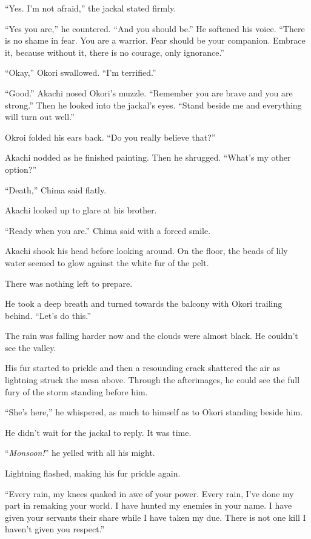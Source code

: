 ``Yes. I'm not afraid,'' the jackal stated firmly.

``Yes you are,'' he countered. ``And you should be.'' He softened his voice. ``There is no shame in fear. You are a warrior. Fear should be your companion. Embrace it, because without it, there is no courage, only ignorance.''

``Okay,'' Okori swallowed. ``I'm terrified.''

``Good.'' Akachi nosed Okori's muzzle. ``Remember you are brave and you are strong.'' Then he looked into the jackal's eyes. ``Stand beside me and everything will turn out well.''

Okroi folded his ears back. ``Do you really believe that?''

Akachi nodded as he finished painting. Then he shrugged. ``What's my other option?''

``Death,'' Chima said flatly.

Akachi looked up to glare at his brother.

``Ready when you are.'' Chima said with a forced smile.

Akachi shook his head before looking around. On the floor, the beads of lily water seemed to glow against the white fur of the pelt.

There was nothing left to prepare.

He took a deep breath and turned towards the balcony with Okori trailing behind. ``Let's do this.''

The rain was falling harder now and the clouds were almost black. He couldn't see the valley.

His fur started to prickle and then a resounding crack shattered the air as lightning struck the mesa above. Through the afterimages, he could see the full fury of the storm standing before him.

``She's here,'' he whispered, as much to himself as to Okori standing beside him.

He didn't wait for the jackal to reply. It was time.

``\emph{Monsoon!}'' he yelled with all his might.

Lightning flashed, making his fur prickle again.

``Every rain, my knees quaked in awe of your power. Every rain, I've done my part in remaking your world. I have hunted my enemies in your name. I have given your servants their share while I have taken my due. There is not one kill I haven't given you respect.''

